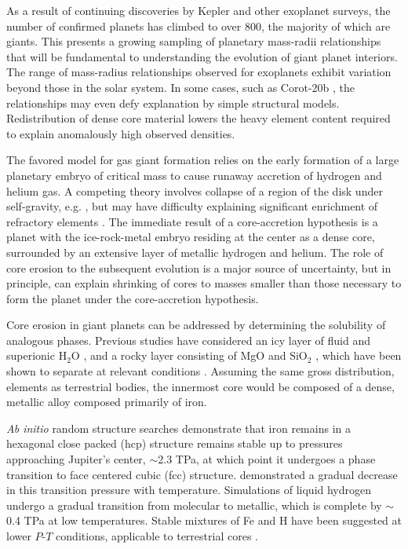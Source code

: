 As a result of continuing discoveries by Kepler \citep{borucki10} and other exoplanet surveys, the
number of confirmed planets has climbed to over 800, the majority of which are
giants. This presents a growing sampling of planetary
mass-radii relationships that will be fundamental to understanding the evolution of
giant planet interiors. The range of mass-radius relationships observed for
exoplanets exhibit variation beyond those in the solar system. In some cases,
such as Corot-20b \citep{deleuil11}, the relationships may even defy explanation by
simple structural models. Redistribution of dense core material lowers the
heavy element content required to explain anomalously high observed densities.

The favored model for gas giant formation
\citep{mizuno78,bodenheimer86,pollack96} relies on the early
formation of a large planetary embryo of critical mass to cause runaway
accretion of hydrogen and helium gas. A competing theory involves collapse of
a region of the disk under self-gravity, e.g. \citep{boss97}, but may
have difficulty explaining significant enrichment of refractory elements \citep{hubbard02,guillot05}.
The immediate result of a core-accretion hypothesis is a planet with the
ice-rock-metal embryo residing at the center as a dense core, surrounded by an
extensive layer of metallic hydrogen and helium. The role of core erosion to
the subsequent evolution is a major source of uncertainty, but in principle, can explain shrinking of
cores to masses smaller than those necessary to form the planet under the
core-accretion hypothesis.

Core erosion in giant planets can be addressed by determining the solubility 
of analogous phases. Previous studies have considered an icy
layer of fluid and superionic $\mathrm{H}_2\mathrm{O}$
\citep{wilson12a,wilson13}, and a rocky layer consisting of
MgO \citep{wilson12b} and $\mathrm{SiO}_2$ \citep{gonzalez13}, which have been
shown to separate at relevant conditions \citep{umemoto06}. Assuming the
same gross distribution, elements as terrestrial bodies, the innermost core
would be composed of a dense, metallic alloy composed primarily of iron.

{\it Ab initio} random structure searches
\citep{pickard09} demonstrate that iron remains in a hexagonal close packed (hcp) structure
remains stable up to pressures approaching Jupiter's center, $\sim$2.3 TPa, at
which point it undergoes a phase transition to face centered cubic (fcc)
structure. \citet{stixrude12} demonstrated a gradual decrease in this transition
pressure with temperature. Simulations of liquid hydrogen
\citep{militzer08,militzer13,mcmahon12} undergo a gradual transition from molecular to
metallic, which is complete by $\sim$ 0.4 TPa at low temperatures.  Stable
mixtures of Fe and H have been suggested at lower $P$-$T$ conditions,
applicable to terrestrial cores \citep{bazhanova12}. 

